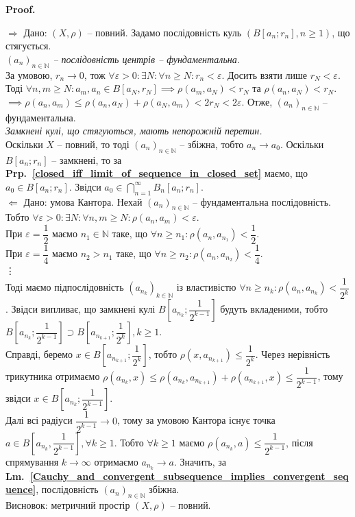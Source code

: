 \documentclass[a4paper, 10pt]{article}
\makeatletter
\def\rightproof{$\boxed{\Rightarrow}$ }
\def\leftproof{$\boxed{\Leftarrow}$ }
\theoremstyle{theoremdd}
\theoremstyle{theoremdd}
\theoremstyle{theoremdd}
\theoremstyle{theoremdd}
\theoremstyle{theoremdd}
\theoremstyle{theoremdd}
\theoremstyle{theoremdd}
\theoremstyle{theoremdd}
\newcommand\prpref[1]{\textbf{Prp.~\ref{#1}}}
\newcommand\lmref[1]{\textbf{Lm.~\ref{#1}}}
\renewenvironment{proof}[1][Proof.\\]{\par
\pushQED{\hfill \qed}%
\normalfont \topsep6\p@\@plus6\p@\relax
\trivlist
\item\relax
{\bfseries
#1\@addpunct{.}}\hspace\labelsep\ignorespaces
}{%
\popQED\endtrivlist\@endpefalse
}
\makeatother
\begin{document}
\begin{proof}
\rightproof Дано: $(X,\rho)$ -- повний. Задамо послідовність куль $(B[a_n;r_n], n \geq 1)$, що стягується.\\
\textit{$(a_n)_{n \in \mathbb{N}}$ -- послідовність центрів -- фундаментальна.}\\
За умовою, $r_n \to 0$, тож $\forall \varepsilon > 0: \exists N: \forall n \geq N: r_n < \varepsilon$. Досить взяти лише $r_N < \varepsilon$. Тоді $\forall n,m \geq N: a_m,a_n \in B[a_N,r_N] \implies \rho(a_m,a_N) < r_N$ та $\rho(a_n,a_N) < r_N$.\\
$\implies \rho(a_n,a_m) \leq \rho(a_n,a_N) + \rho(a_N,a_m) < 2r_N < 2 \varepsilon$. Отже, $(a_n)_{n \in \mathbb{N}}$ -- фундаментальна.
\bigskip \\
\textit{Замкнені кулі, що стягуються, мають непорожній перетин.}\\
Оскільки $X$ -- повний, то тоді $(a_n)_{n \in \mathbb{N}}$ -- збіжна, тобто $a_n \to a_0$. Оскільки $B[a_n;r_n]$ -- замкнені, то за \prpref{closed_iff_limit_of_sequence_in_closed_set} маємо, що $a_0 \in B[a_n;r_n]$. Звідси $a_0 \displaystyle \in \bigcap_{n=1}^\infty B_n[a_n;r_n]$.
\bigskip \\
\leftproof Дано: умова Кантора. Нехай $(a_n)_{n \in \mathbb{N}}$ -- фундаментальна послідовність. Тобто $\forall \varepsilon > 0: \exists N: \forall n,m \geq N: \rho(a_n,a_m) < \varepsilon$.\\
При $\varepsilon = \dfrac{1}{2}$ маємо $n_1 \in \mathbb{N}$ таке, що $\forall n \geq n_1: \rho(a_n,a_{n_1}) < \dfrac{1}{2}$.\\
При $\varepsilon = \dfrac{1}{4}$ маємо $n_2 > n_1$ таке, що $\forall n \geq n_2: \rho(a_n,a_{n_2}) < \dfrac{1}{4}$.\\
\vdots \\
Тоді маємо підпослідовність $(a_{n_k})_{k \in \mathbb{N}}$ із властивістю $\forall n \geq n_k: \rho(a_n,a_{n_k}) < \dfrac{1}{2^k}$. Звідси випливає, що замкнені кулі $B\left[a_{n_k}; \dfrac{1}{2^{k-1}} \right]$ будуть вкладеними, тобто $B\left[ a_{n_k}; \dfrac{1}{2^{k-1}} \right] \supset B\left[ a_{n_{k+1}}; \dfrac{1}{2^k}\right], k \geq 1$.\\
Справді, беремо $x \in B\left[a_{n_{k+1}}; \dfrac{1}{2^{k}} \right]$, тобто $\rho\left(x,a_{n_{k+1}}\right) \leq \dfrac{1}{2^k}$. Через нерівність трикутника отримаємо $\rho\left(a_{n_k}, x\right) \leq \rho\left(a_{n_k}, a_{n_{k+1}}\right) + \rho\left(a_{n_{k+1}},x\right) \leq \dfrac{1}{2^{k-1}}$, тому звідси $x \in B\left[a_{n_k}; \dfrac{1}{2^{k-1}} \right]$.\\
Далі всі радіуси $\dfrac{1}{2^{k-1}} \to 0$, тому за умовою Кантора існує точка $a \in B\left[a_{n_k}, \dfrac{1}{2^{k-1}}\right], \forall k \geq 1$. Тобто $\forall k \geq 1$ маємо $\rho\left(a_{n_k},a\right) \leq \dfrac{1}{2^{k-1}}$, після спрямування $k \to \infty$ отримаємо $a_{n_k} \to a$. Значить, за \lmref{Cauchy_and_convergent_subsequence_implies_convergent_sequence}, послідовність $(a_n)_{n \in \mathbb{N}}$ збіжна.\\
Висновок: метричний простір $(X,\rho)$ -- повний.
\end{proof}
\end{document}
